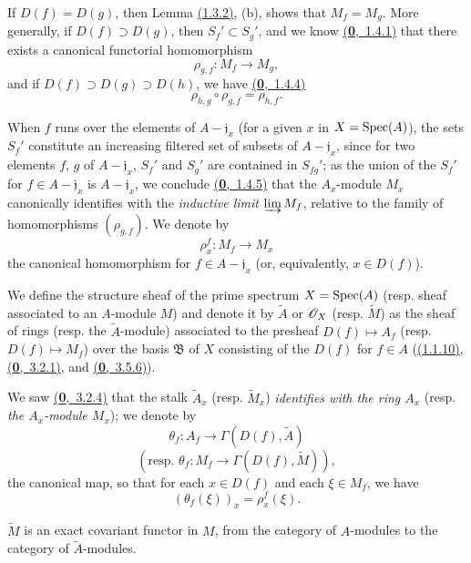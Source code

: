 \begin{env}[1.3.3]
\label{env-1.1.3.3}
If $D(f)=D(g)$, then Lemma \hyperref[lem-1.1.3.2]{(1.3.2)}, (b), shows that $M_f=M_g$. More generally, if
$D(f)\supset D(g)$, then $S_f'\subset S_g'$, and we know \hyperref[env-0.1.4.1]{(\textbf{0},~1.4.1)} that there exists
a canonical functorial homomorphism
\[
  \rho_{g,f}:M_f\longrightarrow M_g,
\]
and if $D(f)\supset D(g)\supset D(h)$, we have \hyperref[env-0.1.4.4]{(\textbf{0},~1.4.4)}
\[
  \rho_{h,g}\circ\rho_{g,f}=\rho_{h,f}.
  \tag{1.3.3.1}
\]
\end{env}

When $f$ runs over the elements of $A-\mathfrak{j}_x$ (for a given $x$ in $X={\mathop{\mathrm{Spec}}\nolimits}(A)$), the
sets $S_f'$ constitute an increasing filtered set of subsets of $A-\mathfrak{j}_x$, since for
two elements $f$, $g$ of $A-\mathfrak{j}_x$, $S_f'$ and $S_g'$ are contained in $S_{fg}'$; as
the union of the $S_f'$ for $f\in A-\mathfrak{j}_x$ is $A-\mathfrak{j}_x$, we conclude
\hyperref[env-0.1.4.5]{(\textbf{0},~1.4.5)} that the $A_x$-module $M_x$ canonically identifies with the {\it inductive
limit} $\varinjlim M_f$, relative to the family of homomorphisms $(\rho_{g,f})$. We denote by
\[
  \rho_x^f:M_f\longrightarrow M_x
\]
the canonical homomorphism for $f\in A-\mathfrak{j}_x$ (or, equivalently, $x\in D(f)$).

\begin{defn}[1.3.4]
\label{defn-1.1.3.4}
We define the structure sheaf of the prime spectrum $X={\mathop{\mathrm{Spec}}\nolimits}(A)$ (resp. sheaf associated to
an $A$-module $M$) and denote it by $\widetilde{A}$ or $\mathscr{O}_X$ (resp. $\widetilde{M}$) as the
sheaf of rings (resp. the $\widetilde{A}$-module) associated to the presheaf
$D(f)\mapsto A_f$ (resp. $D(f)\mapsto M_f$) over the basis $\mathfrak{B}$ of $X$ consisting
of the $D(f)$ for $f\in A$ (\hyperref[prop-1.1.1.10]{(1.1.10)}, \hyperref[env-0.3.2.1]{(\textbf{0},~3.2.1)}, and
\hyperref[env-0.3.5.6]{(\textbf{0},~3.5.6)}).
\end{defn}

We saw \hyperref[env-0.3.2.4]{(\textbf{0},~3.2.4)} that the stalk $\widetilde{A}_x$ (resp. $\widetilde{M}_x$)
{\it identifies with the ring $A_x$} (resp. {\it the $A_x$-module $M_x$}); we denote by
\[
  \theta_f:A_f\longrightarrow\Gamma(D(f),\widetilde{A})
\]
\[
  (\text{resp. }\theta_f:M_f\longrightarrow\Gamma(D(f),\widetilde{M})),
\]
the canonical map, so that for each $x\in D(f)$ and each $\xi\in M_f$, we have
\[
  (\theta_f(\xi))_x=\rho_x^f(\xi).
  \tag{1.3.4.1}
\]

\begin{prop}[1.3.5]
\label{prop-1.1.3.5}
$\widetilde{M}$ is an exact covariant functor in $M$, from the category of $A$-modules to the
category of $\widetilde{A}$-modules.
\end{prop}

